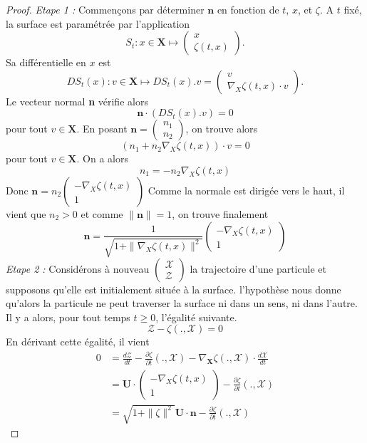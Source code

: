 \documentclass[12pt,a4paper]{article}
\numberwithin{equation}{section}
\begin{document}
\begin{proof}
\textit{Etape 1 : }Commençons par déterminer $\textbf{n}$ en fonction de $t$, $x$, et $\zeta$. A $t$ fixé, la surface est paramétrée par l'application $$S_t: x\in \textbf{X} \mapsto \left(\begin{array}{l}
         x\\
         \zeta(t,x)
    \end{array}\right).$$
Sa différentielle en $x$ est 
$$DS_t(x) : v \in \textbf{X} \mapsto DS_t(x).v = \left(\begin{array}{l}
         v\\
         \nabla_X\zeta(t,x) \cdot v
    \end{array}\right).$$
Le vecteur normal \textbf{n} vérifie alors $$\textbf{n}\cdot (DS_t(x).v) = 0$$
pour tout $v \in \textbf{X}$. En posant $\textbf{n} = \left(\begin{array}{l}
         n_1\\
         n_2
    \end{array}\right)$, on trouve alors
    $$ \left(n_1 + n_2\nabla_X\zeta(t,x)\right)\cdot v = 0$$
pour tout $v\in\textbf{X}$. On a alors
$$ n_1 =  - n_2\nabla_X\zeta(t,x)$$
Donc $\textbf{n} = n_2\left(\begin{array}{l}
         - \nabla_X\zeta(t,x)\\
         1
    \end{array}\right)$
Comme la normale est dirigée vers le haut, il vient que $n_2>0$ et comme $\|\textbf{n}\| = 1$, on trouve finalement $$\textbf{n} = \frac{1}{\sqrt{1+\|\nabla_X\zeta(t,x)\|^2}}\left(\begin{array}{l}
         - \nabla_X\zeta(t,x)\\
         1
    \end{array}\right)$$
\textit{Etape 2 : }Considérons à nouveau $\left(\begin{array}{l}
         \mathcal{X}\\
         \mathcal{Z}
\end{array}\right)$ 
la trajectoire d'une particule et supposons qu'elle est initialement située à la surface. l'hypothèse nous donne qu'alors la particule ne peut traverser la surface ni dans un sens, ni dans l'autre. Il y a alors, pour tout temps $t \geq 0$, l'égalité suivante.
$$\mathcal{Z} - \zeta( . ,\mathcal{X}) = 0 $$
En dérivant cette égalité, il vient
\begin{align*} 
    0 &= \frac{d\mathcal{Z}}{dt} - \frac{\partial \zeta}{\partial t}(.,\mathcal{X}) - \nabla_\textbf{X}\zeta(.,\mathcal{X}) \cdot \frac{d \mathcal{X}}{dt} \\ 
    &=  \textbf{U}\cdot  \left(\begin{array}{l}
         - \nabla_X\zeta(t,x)\\
         1
    \end{array}\right) - \frac{\partial \zeta}{\partial t}(.,\mathcal{X}) 
    \\&= \sqrt{1 + \|\zeta\|^2}\textbf{U}  \cdot \textbf{n} - \frac{\partial \zeta}{\partial t}(.,\mathcal{X}) 
\end{align*}



\end{proof}
\end{document}
